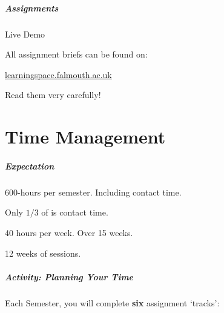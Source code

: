 \begin{frame}
	\frametitle{Assignments}
	
	Live Demo
	
	\vspace{3em}
	
	All assignment briefs can be found on:
	
	\vspace{0.5em}
	
	\indent \url{learningspace.falmouth.ac.uk}
	
	\vspace{0.5em}
	
	Read them very carefully!
	
\end{frame}


\part{Time Management}
\frame{\partpage}

\begin{frame}
	\frametitle{Expectation}
	
	600-hours per semester. Including contact time.
	
	Only $1/3$ of is contact time.
	
	40 hours per week. Over 15 weeks. 
	
	12 weeks of sessions.

\end{frame}

\begin{frame}
	\frametitle{Activity: Planning Your Time}
	
	Each Semester, you will complete \textbf{six} assignment `tracks':

\end{frame}



